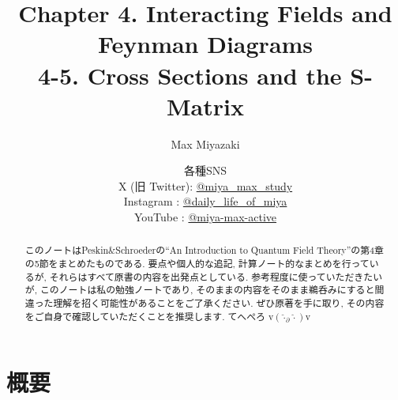 \documentclass[a4paper,12pt]{article}
\title{Chapter 4. Interacting Fields and Feynman Diagrams\\
4-5. Cross Sections and the S-Matrix}
\date{各種SNS\\
    X (旧 Twitter): \href{https://x.com/miya_max_study}{@miya\_max\_study}\\
    Instagram : \href{https://www.instagram.com/daily_life_of_miya/}{@daily\_life\_of\_miya}\\
    YouTube : \href{https://www.youtube.com/@miya-max-active}{@miya-max-active}
    }
\author{Max Miyazaki}
\begin{document}
\maketitle

\vspace{1cm}
\begin{abstract}
    このノートはPeskin\&Schroederの``An Introduction to Quantum Field Theory''の第4章の5節をまとめたものである. 要点や個人的な追記, 計算ノート的なまとめを行っているが, それらはすべて原書の内容を出発点としている. 参考程度に使っていただきたいが, このノートは私の勉強ノートであり, そのままの内容をそのまま鵜呑みにすると間違った理解を招く可能性があることをご了承ください. ぜひ原著を手に取り, その内容をご自身で確認していただくことを推奨します. てへぺろ v$({\hat{\cdot}_\partial \hat{\cdot}})$v
\end{abstract}
    
    

\newpage
\color{blue}
\section*{概要}
\end{document}
